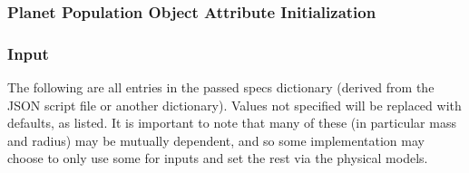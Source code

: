 \documentclass[cleanfoot]{asme2ej}
\begin{document}
\label{sec:planetpopulation}
\subsubsection{Planet Population Object Attribute Initialization} 

\subsubsection*{Input}
The following are all entries in the passed specs dictionary (derived from the JSON script file or another dictionary).  Values not specified will be replaced with defaults, as listed.  It is important to note that many of these (in particular mass and radius) may be mutually dependent, and so some implementation may choose to only use some for inputs and set the rest via the physical models.
\end{document}
